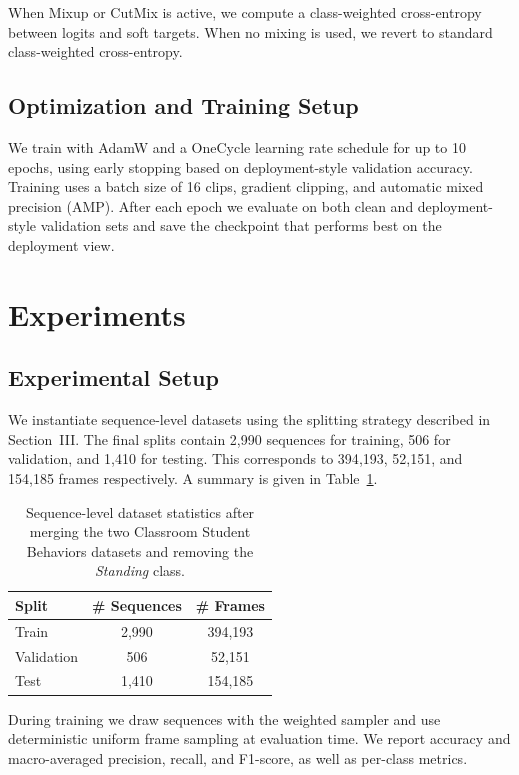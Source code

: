 \documentclass[conference]{IEEEtran}
\begin{document}
When Mixup or CutMix is active, we compute a class-weighted cross-entropy between logits and soft targets. When no mixing is used, we revert to standard class-weighted cross-entropy.

\subsection{Optimization and Training Setup}

We train with AdamW and a OneCycle learning rate schedule for up to 10 epochs, using early stopping based on deployment-style validation accuracy. Training uses a batch size of 16 clips, gradient clipping, and automatic mixed precision (AMP). After each epoch we evaluate on both clean and deployment-style validation sets and save the checkpoint that performs best on the deployment view.

\section{Experiments}

\subsection{Experimental Setup}

We instantiate sequence-level datasets using the splitting strategy described in Section~III. The final splits contain 2{,}990 sequences for training, 506 for validation, and 1{,}410 for testing. This corresponds to 394{,}193, 52{,}151, and 154{,}185 frames respectively. A summary is given in Table~\ref{tab:dataset}.

\begin{table}[t]
\centering
\caption{Sequence-level dataset statistics after merging the two Classroom Student Behaviors datasets and removing the \textit{Standing} class.}
\label{tab:dataset}
\begin{tabular}{lcc}
\hline
\textbf{Split} & \textbf{\# Sequences} & \textbf{\# Frames} \\
\hline
Train      & 2{,}990 & 394{,}193 \\
Validation & 506     & 52{,}151  \\
Test       & 1{,}410 & 154{,}185 \\
\hline
\end{tabular}
\end{table}

During training we draw sequences with the weighted sampler and use deterministic uniform frame sampling at evaluation time. We report accuracy and macro-averaged precision, recall, and F1-score, as well as per-class metrics.
\end{document}
